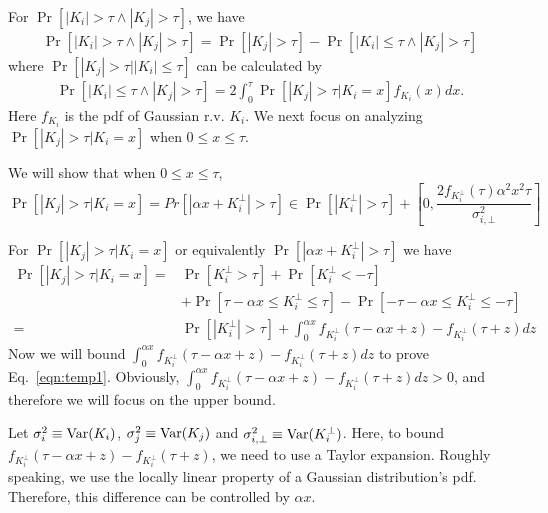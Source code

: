 For $\Pr[|K_i| > \tau \wedge |K_j| > \tau ]$, we have
\begin{equation}
\begin{split}
    \Pr[|K_i| > \tau \wedge |K_j| > \tau ]
    =\Pr[|K_j| > \tau] - \Pr[|K_i| \leq \tau \wedge |K_j| > \tau ]  
\end{split}
\end{equation}
where $\Pr[ |K_j| > \tau | |K_i| \leq \tau]$ can be calculated by
\begin{equation} 
\begin{split}
    \Pr[|K_i| \leq \tau \wedge |K_j| > \tau ] 
    = 2 \int_0^{\tau} \Pr\left[|K_j |>\tau \Big | K_i = x\right]f_{K_i}(x) dx  .
\end{split}
\end{equation}
Here $f_{K_i}$ is the pdf of Gaussian r.v. $K_i$. We next focus on analyzing $\Pr[|K_j|> \tau | K_i = x]$ when $0 \leq x \leq \tau$. 

We will show that when $0 \leq x \leq \tau$,
\begin{equation} \label{eqn:temp1}
    \Pr[|K_j|> \tau | K_i = x]
    =Pr\left[|\alpha x + K^{\bot}_i| > \tau \right] 
    \in \Pr[|K^{\bot}_i| > \tau] + \left[0, \frac{2f_{K^{\bot}_i}(\tau)\alpha^2 x^2 \tau}{\sigma^2_{i, \bot}}\right]
\end{equation}

For $\Pr[|K_j|> \tau | K_i = x] $ or equivalently $\Pr[|\alpha x + K^{\bot}_i|> \tau ] $ we have
\begin{equation}\label{eqn:lowerprob}
\begin{split}
    \Pr[|K_j|> \tau | K_i = x] 
    =& \Pr[K^{\bot}_i > \tau] + \Pr[K^{\bot}_i < - \tau] \\ 
    &+ \Pr[\tau - \alpha x \leq K^{\bot}_i \leq \tau] - \Pr[-\tau - \alpha x \leq K^{\bot}_i \leq -\tau]  \\ 
    =& \Pr[|K^{\bot}_i| > \tau] +  \int_0^{\alpha x}f_{K^{\bot}_i}(\tau - \alpha x+z) - f_{K^{\bot}_i}(\tau + z)dz
\end{split}
\end{equation}
Now we will bound $\int_0^{\alpha x}f_{K^{\bot}_i}(\tau - \alpha x+z) - f_{K^{\bot}_i}(\tau + z)dz$ to prove Eq.~\ref{eqn:temp1}. Obviously, $\int_0^{\alpha x}f_{K^{\bot}_i}(\tau - \alpha x+z) - f_{K^{\bot}_i}(\tau + z)dz >0$, and therefore we will focus on the upper bound.  

Let $\sigma^2_i \equiv \mathrm{Var}(K_i)$, $\sigma^2_j \equiv \mathrm{Var}(K_j)$ and $\sigma^2_{i,\bot} \equiv \mathrm{Var}(K^{\bot}_i)$. Here, to bound $f_{K^{\bot}_i}(\tau - \alpha x+z) - f_{K^{\bot}_i}(\tau + z)$, we need to use a Taylor expansion. Roughly speaking, we use the locally linear property of a Gaussian distribution's pdf. Therefore, this difference can be controlled by $\alpha x$. 

